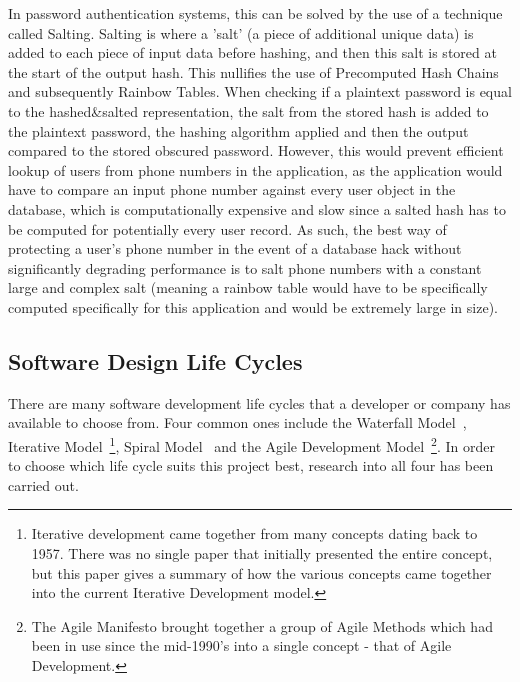 \documentclass{article}
\begin{document}
In password authentication systems, this can be solved by the use of a technique called Salting.  Salting is where a 'salt' (a piece of additional unique data) is added to each piece of input data before hashing, and then this salt is stored at the start of the output hash.  This nullifies the use of Precomputed Hash Chains and subsequently Rainbow Tables. When checking if a plaintext password is equal to the hashed&salted representation, the salt from the stored hash is added to the plaintext password, the hashing algorithm applied and then the output compared to the stored obscured password. However, this would prevent efficient lookup of users from phone numbers in the application, as the application would have to compare an input phone number against every user object in the database, which is computationally expensive and slow since a salted hash has to be computed for potentially every user record.  As such, the best way of protecting a user's phone number in the event of a database hack without significantly degrading performance is to salt phone numbers with a constant large and complex salt (meaning a rainbow table would have to be specifically computed specifically for this application and would be extremely large in size).

\subsection{Software Design Life Cycles}
There are many software development life cycles that a developer or company has available to choose from.  Four common ones include the Waterfall Model~\cite{royce1970managing-FirstDescriptionOfWaterFallModelNotByName}, Iterative Model~\cite{briefHistoryOfIncrementalAndIterativeSoftwareDevelopment}\footnote{Iterative development came together from many concepts dating back to 1957.  There was no single paper that initially presented the entire concept, but this paper gives a summary of how the various concepts came together into the current Iterative Development model.}, Spiral Model~\cite{spiralModelSoftwareDevelopment} and the Agile Development Model~\cite{beck2001agile}\footnote{The Agile Manifesto brought together a group of Agile Methods which had been in use since the mid-1990's into a single concept - that of Agile Development.}.  In order to choose which life cycle suits this project best, research into all four has been carried out.

\end{document}
